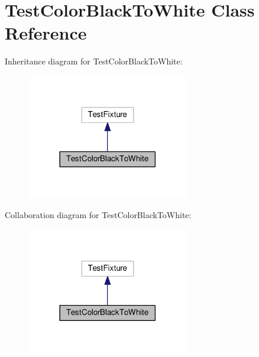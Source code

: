 \hypertarget{class_test_color_black_to_white}{}\section{Test\+Color\+Black\+To\+White Class Reference}
\label{class_test_color_black_to_white}


Inheritance diagram for Test\+Color\+Black\+To\+White\+:
\nopagebreak
\begin{figure}[H]
\begin{center}
\leavevmode
\includegraphics[width=201pt]{class_test_color_black_to_white__inherit__graph}
\end{center}
\end{figure}


Collaboration diagram for Test\+Color\+Black\+To\+White\+:
\nopagebreak
\begin{figure}[H]
\begin{center}
\leavevmode
\includegraphics[width=201pt]{class_test_color_black_to_white__coll__graph}
\end{center}
\end{figure}

